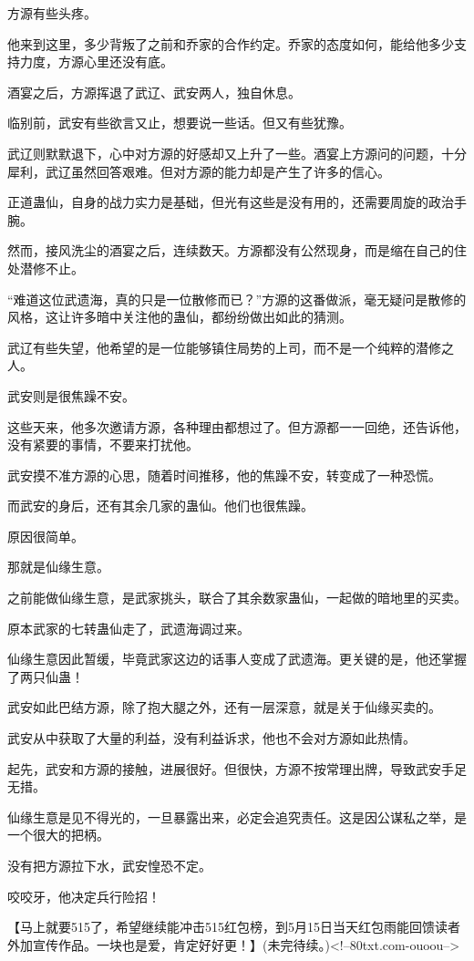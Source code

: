 \begin{this_body}
方源有些头疼。

他来到这里，多少背叛了之前和乔家的合作约定。乔家的态度如何，能给他多少支持力度，方源心里还没有底。

酒宴之后，方源挥退了武辽、武安两人，独自休息。

临别前，武安有些欲言又止，想要说一些话。但又有些犹豫。

武辽则默默退下，心中对方源的好感却又上升了一些。酒宴上方源问的问题，十分犀利，武辽虽然回答艰难。但对方源的能力却是产生了许多的信心。

正道蛊仙，自身的战力实力是基础，但光有这些是没有用的，还需要周旋的政治手腕。

然而，接风洗尘的酒宴之后，连续数天。方源都没有公然现身，而是缩在自己的住处潜修不止。

“难道这位武遗海，真的只是一位散修而已？”方源的这番做派，毫无疑问是散修的风格，这让许多暗中关注他的蛊仙，都纷纷做出如此的猜测。

武辽有些失望，他希望的是一位能够镇住局势的上司，而不是一个纯粹的潜修之人。

武安则是很焦躁不安。

这些天来，他多次邀请方源，各种理由都想过了。但方源都一一回绝，还告诉他，没有紧要的事情，不要来打扰他。

武安摸不准方源的心思，随着时间推移，他的焦躁不安，转变成了一种恐慌。

而武安的身后，还有其余几家的蛊仙。他们也很焦躁。

原因很简单。

那就是仙缘生意。

之前能做仙缘生意，是武家挑头，联合了其余数家蛊仙，一起做的暗地里的买卖。

原本武家的七转蛊仙走了，武遗海调过来。

仙缘生意因此暂缓，毕竟武家这边的话事人变成了武遗海。更关键的是，他还掌握了两只仙蛊！

武安如此巴结方源，除了抱大腿之外，还有一层深意，就是关于仙缘买卖的。

武安从中获取了大量的利益，没有利益诉求，他也不会对方源如此热情。

起先，武安和方源的接触，进展很好。但很快，方源不按常理出牌，导致武安手足无措。

仙缘生意是见不得光的，一旦暴露出来，必定会追究责任。这是因公谋私之举，是一个很大的把柄。

没有把方源拉下水，武安惶恐不定。

咬咬牙，他决定兵行险招！

【马上就要515了，希望继续能冲击515红包榜，到5月15日当天红包雨能回馈读者外加宣传作品。一块也是爱，肯定好好更！】(未完待续。)<!--80txt.com-ouoou-->

\end{this_body}

